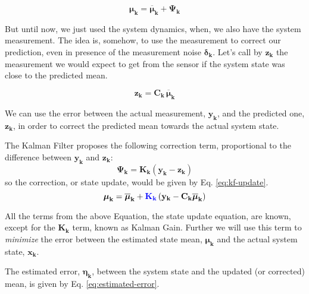 \documentclass[12pt]{article}
\newcommand{\bvec}[1]{\boldsymbol{\mathbf{#1}}} %
\newcommand{\mat}[1]{\boldsymbol{\mathbf{#1}}}
\newcommand{\parentheses}[1]{\left(#1\right)}
\newcommand{\mb}[1]{{\boldsymbol{#1}}} %
\newcommand{\blue}[1]{\color{blue}#1\color{black}}
\begin{document}
\begin{equation}
    \mb{\mu}_\mathbf{k} = \mb{\overline{\mu}}_\mathbf{k} + \mat{\Psi_k}
\end{equation}

But until now, we just used the system dynamics, when, we also have the system measurement. The idea is, somehow, to use the measurement to correct our prediction, even in presence of the measurement noise $\mb{\delta}_\mathbf{k}$. Let's call by $\bvec{z_k}$ the measurement we would expect to get from the sensor if the system state was close to the predicted mean.

\begin{equation}
    \bvec{z_k} = \mat{C_k}\, \mb{\overline{\mu}}_\mathbf{k}
\end{equation}

We can use the error between the actual measurement, $\bvec{y_k}$, and the predicted one, $\bvec{z_k}$, in order to correct the predicted mean towards the actual system state. 

The Kalman Filter proposes the following correction term, proportional to the difference between $\bvec{y_k}$ and $\bvec{z_k}$:
\begin{equation}
    \mat{\Psi_k} = \mat{K_k}\parentheses{\bvec{y_k} - \bvec{z_k}}
    \label{eq:kalman-correction-term}
\end{equation}
so the correction, or state update, would be given by Eq. \ref{eq:kf-update}.
\begin{equation}
    \mb{\mu}_\mathbf{k} = \mb{\overline{\mu}}_\mathbf{k} + \blue{\mat{K_k}}\parentheses{\bvec{y_k} - \mat{C_k}\mb{\overline{\mu}}_\mathbf{k}}
    \label{eq:kf-update}
\end{equation}

All the terms from the above Equation, the state update equation, are known, except for the $\mat{K_k}$ term, known as Kalman Gain. Further we will use this term to \emph{minimize} the error between the estimated state mean, $\mb{\mu}_\mathbf{k}$ and the actual system state, $\bvec{x_k}$.

The estimated error, $\mb{\eta}_\mathbf{k}$, between the system state and the updated (or corrected) mean, is given by Eq. \ref{eq:estimated-error}.
\end{document}
